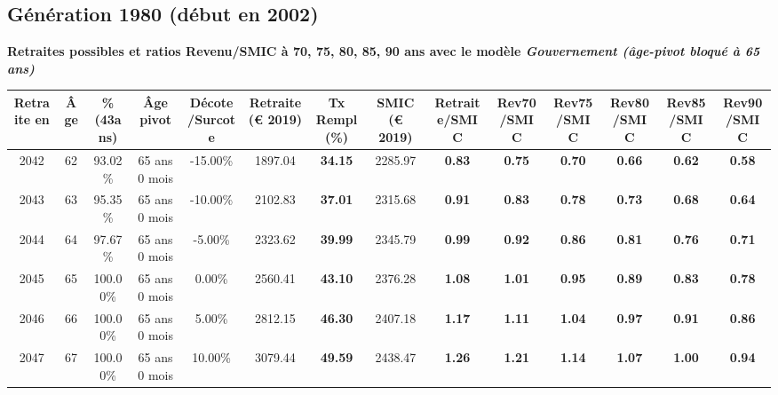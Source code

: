 \newpage 
 
\subsection{Génération 1980 (début en 2002)} 

{\bf \noindent Retraites possibles et ratios Revenu/SMIC à 70, 75, 80, 85, 90 ans avec le modèle \emph{Gouvernement (âge-pivot bloqué à 65 ans)}}  
 
\begin{adjustbox}{max width=\textwidth} 
\begin{tabular}[htb]{|c|c||c|c|c||c|c||c||c|c|c|c|c|c|} 
\hline 
 Retraite en &  Âge &  \%(43ans) &  Âge pivot &  Décote/Surcote &  Retraite (\euro{} 2019) &  Tx Rempl(\%) &  SMIC (\euro{} 2019) &  Retraite/SMIC &  Rev70/SMIC &  Rev75/SMIC &  Rev80/SMIC &  Rev85/SMIC &  Rev90/SMIC \\ 
\hline \hline 
 2042 &  62 &  93.02\% &  65 ans 0 mois &  -15.00\% &  1897.04 &  {\bf 34.15} &  2285.97 &  {\bf {\color{red} 0.83}} &  {\bf {\color{red} 0.75}} &  {\bf {\color{red} 0.70}} &  {\bf {\color{red} 0.66}} &  {\bf {\color{red} 0.62}} &  {\bf {\color{red} 0.58}} \\ 
\hline 
 2043 &  63 &  95.35\% &  65 ans 0 mois &  -10.00\% &  2102.83 &  {\bf 37.01} &  2315.68 &  {\bf {\color{red} 0.91}} &  {\bf {\color{red} 0.83}} &  {\bf {\color{red} 0.78}} &  {\bf {\color{red} 0.73}} &  {\bf {\color{red} 0.68}} &  {\bf {\color{red} 0.64}} \\ 
\hline 
 2044 &  64 &  97.67\% &  65 ans 0 mois &  -5.00\% &  2323.62 &  {\bf 39.99} &  2345.79 &  {\bf {\color{red} 0.99}} &  {\bf {\color{red} 0.92}} &  {\bf {\color{red} 0.86}} &  {\bf {\color{red} 0.81}} &  {\bf {\color{red} 0.76}} &  {\bf {\color{red} 0.71}} \\ 
\hline 
 2045 &  65 &  100.00\% &  65 ans 0 mois &  0.00\% &  2560.41 &  {\bf 43.10} &  2376.28 &  {\bf 1.08} &  {\bf 1.01} &  {\bf {\color{red} 0.95}} &  {\bf {\color{red} 0.89}} &  {\bf {\color{red} 0.83}} &  {\bf {\color{red} 0.78}} \\ 
\hline 
 2046 &  66 &  100.00\% &  65 ans 0 mois &  5.00\% &  2812.15 &  {\bf 46.30} &  2407.18 &  {\bf 1.17} &  {\bf 1.11} &  {\bf 1.04} &  {\bf {\color{red} 0.97}} &  {\bf {\color{red} 0.91}} &  {\bf {\color{red} 0.86}} \\ 
\hline 
 2047 &  67 &  100.00\% &  65 ans 0 mois &  10.00\% &  3079.44 &  {\bf 49.59} &  2438.47 &  {\bf 1.26} &  {\bf 1.21} &  {\bf 1.14} &  {\bf 1.07} &  {\bf 1.00} &  {\bf {\color{red} 0.94}} \\ 
\hline 
\hline 
\end{tabular} 
\end{adjustbox} 
 
